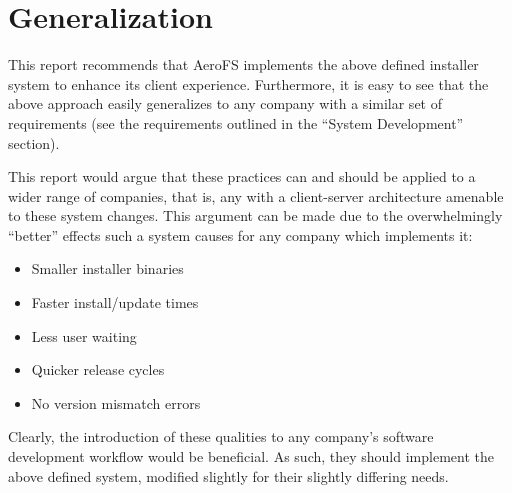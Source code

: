 \documentclass[12pt]{article}
\begin{document}
\section{Generalization}
This report recommends that AeroFS implements the above defined installer system to enhance its client experience. Furthermore, it is easy to see that the above approach easily generalizes to any company with a similar set of requirements (see the requirements outlined in the ``System Development'' section).

This report would argue that these practices can and should be applied to a wider range of companies, that is, any with a client-server architecture amenable to these system changes. This argument can be made due to the overwhelmingly ``better'' effects such a system causes for any company which implements it:
\begin{itemize}
\item Smaller installer binaries
\item Faster install/update times
\item Less user waiting
\item Quicker release cycles
\item No version mismatch errors
\end{itemize}

Clearly, the introduction of these qualities to any company's software development workflow would be beneficial. As such, they should implement the above defined system, modified slightly for their slightly differing needs.
\newpage



\newpage
\end{document}
